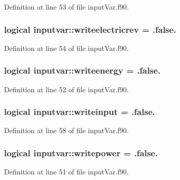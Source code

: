 Definition at line 53 of file input\-Var.\-f90.

\hypertarget{classinputvar_afd3b4bc26c396eaba06cecc08717acf1}{
\subsubsection[{writeelectricrev}]{\setlength{\rightskip}{0pt plus 5cm}logical inputvar\-::writeelectricrev = .false.}}\label{classinputvar_afd3b4bc26c396eaba06cecc08717acf1}


Definition at line 54 of file input\-Var.\-f90.

\hypertarget{classinputvar_ae3e52c17a47fe8dd3e860abff881cfb0}{
\subsubsection[{writeenergy}]{\setlength{\rightskip}{0pt plus 5cm}logical inputvar\-::writeenergy = .false.}}\label{classinputvar_ae3e52c17a47fe8dd3e860abff881cfb0}


Definition at line 52 of file input\-Var.\-f90.

\hypertarget{classinputvar_a97c8b194b0db24c1c790d57bcc7b0f70}{
\subsubsection[{writeinput}]{\setlength{\rightskip}{0pt plus 5cm}logical inputvar\-::writeinput = .false.}}\label{classinputvar_a97c8b194b0db24c1c790d57bcc7b0f70}


Definition at line 58 of file input\-Var.\-f90.

\hypertarget{classinputvar_ae3e0dfd2907bb36d0f62715b24f63536}{
\subsubsection[{writepower}]{\setlength{\rightskip}{0pt plus 5cm}logical inputvar\-::writepower = .false.}}\label{classinputvar_ae3e0dfd2907bb36d0f62715b24f63536}


Definition at line 51 of file input\-Var.\-f90.

